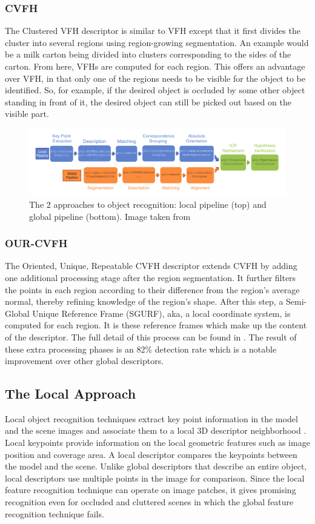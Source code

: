 \documentclass[journal]{IEEEtran}
\begin{document}
\subsubsection{CVFH}
The Clustered VFH descriptor is similar to VFH except that it first divides the cluster into several regions using region-growing segmentation.  An example would be a milk carton being divided into clusters corresponding to the sides of the carton.  From here, VFHs are computed for each region.  This offers an  advantage over VFH, in that only one of the regions needs to be visible for the object to be identified.  So, for example, if the desired object is occluded by some other object standing in front of it, the desired object can still be picked out based on the visible part.
\begin{figure}
  \includegraphics[width=\textwidth]{images/image12}
  \caption{The 2 approaches to object recognition: local pipeline (top) and global pipeline (bottom).  Image taken from \cite{aldoma2} }
\end{figure}

\subsubsection{OUR-CVFH}
The Oriented, Unique, Repeatable CVFH descriptor extends CVFH by adding one additional processing stage after the region segmentation.  It further filters the points in each region according to their difference from the region’s average normal, thereby refining knowledge of the region’s shape.  
	After this step, a Semi-Global Unique Reference Frame (SGURF), aka, a local coordinate system, is computed for each region.  It is these reference frames which make up the content of the descriptor.  The full detail of this process can be found in \cite{aldoma4}. 
	The result of these extra processing phases is an 82\% detection rate which is a notable improvement over other global descriptors.\cite{aldoma4}
	
\subsection{The Local Approach}
Local object recognition techniques extract key point information in the model and the scene images and associate them to a local 3D descriptor neighborhood \cite{aldoma}. Local keypoints provide information on the local geometric features such as image position and coverage area. A local descriptor compares the keypoints between the model and the scene. Unlike global descriptors that describe an entire object, local descriptors use multiple points in the image for comparison. Since the local feature recognition technique can operate on image patches, it gives promising recognition even for occluded and cluttered scenes in which the global feature recognition technique fails.
\end{document}

